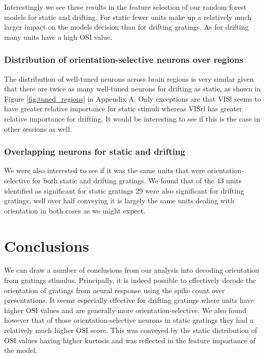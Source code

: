 \documentclass[10pt,twocolumn]{article}
\begin{document}
Interestingly we see these results in the feature selection of our random forest models for static and drifting. For static fewer units make up a relatively much larger impact on the models decision than for drifting gratings. As for drifting many units have a high OSI value. 

\subsubsection{Distribution of orientation-selective neurons over regions}

The distribution of well-tuned neurons across brain regions is very similar given that there are twice as many well-tuned neurons for drifting as static, as shown in Figure \ref{fig:tuned_regions} in Appendix A. Only exceptions are that VISl seems to have greater relative importance for static stimuli whereas VISrl has greater relative importance for drifting. It would be interesting to see if this is the case in other sessions as well.

\subsubsection{Overlapping neurons for static and drifting}

We were also interested to see if it was the same units that were orientation-selective for both static and drifting gratings. We found that of the 43 units identified as significant for static gratings 29 were also significant for drifting gratings, well over half conveying it is largely the same units dealing with orientation in both cases as we might expect.

\section{Conclusions}

We can draw a number of conclusions from our analysis into decoding orientation from gratings stimulus. Principally, it is indeed possible to effectively decode the orientation of gratings from neural response using the spike count over presentations. It seems especially effective for drifting gratings where units have higher OSI values and are generally more orientation-selective. We also found however that of those orientation-selective neurons in static gratings they had a relatively much higher OSI score. This was conveyed by the static distribution of OSI values having higher kurtosis and was reflected in the feature importance of the model.
\end{document}
